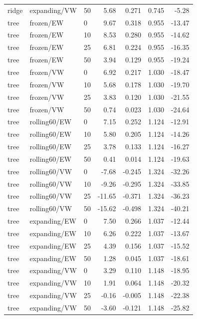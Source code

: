 {\begin{longtable}{@{}lllrrrr@{}}
ridge & expanding/VW & 50 & 5.68 & 0.271 & 0.745 & -5.28\\
tree & frozen/EW & 0 & 9.67 & 0.318 & 0.955 & -13.47\\
tree & frozen/EW & 10 & 8.53 & 0.280 & 0.955 & -14.62\\
tree & frozen/EW & 25 & 6.81 & 0.224 & 0.955 & -16.35\\
tree & frozen/EW & 50 & 3.94 & 0.129 & 0.955 & -19.24\\
tree & frozen/VW & 0 & 6.92 & 0.217 & 1.030 & -18.47\\
tree & frozen/VW & 10 & 5.68 & 0.178 & 1.030 & -19.70\\
tree & frozen/VW & 25 & 3.83 & 0.120 & 1.030 & -21.55\\
tree & frozen/VW & 50 & 0.74 & 0.023 & 1.030 & -24.64\\
tree & rolling60/EW & 0 & 7.15 & 0.252 & 1.124 & -12.91\\
tree & rolling60/EW & 10 & 5.80 & 0.205 & 1.124 & -14.26\\
tree & rolling60/EW & 25 & 3.78 & 0.133 & 1.124 & -16.27\\
tree & rolling60/EW & 50 & 0.41 & 0.014 & 1.124 & -19.63\\
tree & rolling60/VW & 0 & -7.68 & -0.245 & 1.324 & -32.26\\
tree & rolling60/VW & 10 & -9.26 & -0.295 & 1.324 & -33.85\\
tree & rolling60/VW & 25 & -11.65 & -0.371 & 1.324 & -36.23\\
tree & rolling60/VW & 50 & -15.62 & -0.498 & 1.324 & -40.21\\
tree & expanding/EW & 0 & 7.50 & 0.266 & 1.037 & -12.44\\
tree & expanding/EW & 10 & 6.26 & 0.222 & 1.037 & -13.67\\
tree & expanding/EW & 25 & 4.39 & 0.156 & 1.037 & -15.52\\
tree & expanding/EW & 50 & 1.28 & 0.045 & 1.037 & -18.61\\
tree & expanding/VW & 0 & 3.29 & 0.110 & 1.148 & -18.95\\
tree & expanding/VW & 10 & 1.91 & 0.064 & 1.148 & -20.32\\
tree & expanding/VW & 25 & -0.16 & -0.005 & 1.148 & -22.38\\
tree & expanding/VW & 50 & -3.60 & -0.121 & 1.148 & -25.82\\
\end{longtable}
}
